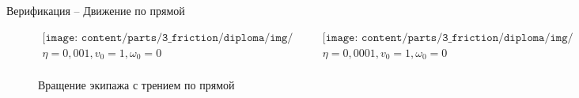 \begin{frame}{Верификация -- Движение по прямой}
    \vspace{-50pt}
    \begin{figure}[h]
        \begin{center}\begin{equation*}\begin{array}{cc}
            \texttt{[image: content/parts/3\_friction/diploma/img/res/comparison\_v\_1\_0\_omega\_0\_frac\_1e-3\_n\_4\_time\_10s.png]}
            &
            \texttt{[image: content/parts/3\_friction/diploma/img/res/comparison\_v\_1\_0\_omega\_0\_frac\_1e-4\_n\_4\_time\_10s.png]}\\
            \eta = 0,001, v_0 = 1, \omega_0 = 0 & \eta = 0,0001, v_0 = 1, \omega_0 = 0\\
        \end{array}\end{equation*}\end{center}
        \caption{Вращение экипажа с трением по прямой}
    \end{figure}
\end{frame}
